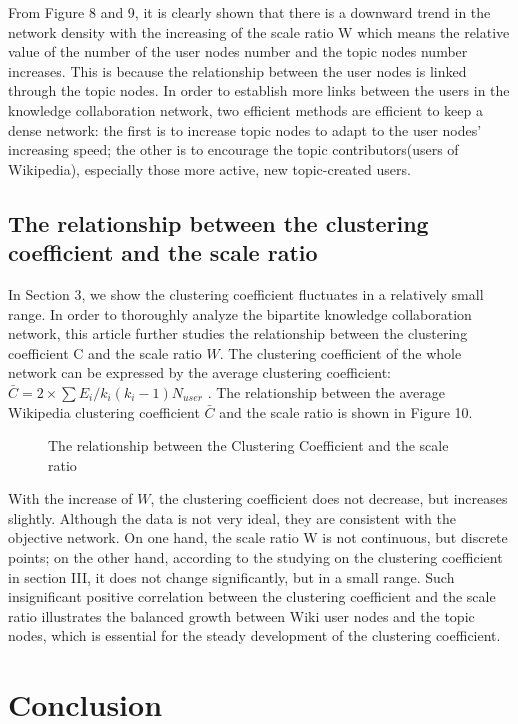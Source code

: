 \documentclass{elsarticle}
\begin{document}
From Figure 8 and 9, it is clearly shown that there is a downward
trend in the network density with the increasing of the scale ratio W
which means the relative value of the number of the user nodes number
and the topic nodes number increases. This is because the relationship
between the user nodes is linked through the topic nodes.  In order to
establish more links between the users in the knowledge collaboration
network,  two efficient methods are efficient to keep a dense network:
the first is to increase topic nodes to adapt to the user nodes’
increasing speed; the other is to encourage the topic
contributors(users of Wikipedia), especially those more active, new topic-created users. 

\subsection{ The relationship between the clustering coefficient and the scale ratio}
\label{sec:relat-betw-clust}
 In Section 3, we show the clustering coefficient fluctuates in a
relatively small range.  In order to thoroughly
analyze the bipartite knowledge collaboration network, this article
further studies the relationship between the clustering coefficient C
and the scale ratio $W$. The clustering coefficient of the whole
network can be expressed by the average clustering coefficient:
$\bar{C}=2\times \sum E_i/k_i(k_i-1)N_{user}$ . The
relationship between the average Wikipedia clustering coefficient
$\bar{C}$ and the scale ratio is shown in Figure 10. 
\begin{figure}[htpb]
  \centering
  \scalebox{0.3}{\texttt{[image: 10]}}
  \caption{The relationship between the  Clustering Coefficient  and the scale ratio}
\end{figure}

With the increase of $W$, the clustering coefficient does not decrease, but increases slightly. Although the data is not very ideal, they are consistent with the objective network. On one hand, the scale ratio W is not continuous, but discrete points; on the other hand, according to the studying on the clustering coefficient in section III, it does not change significantly, but in a small range. Such insignificant positive correlation between the clustering coefficient and the scale ratio illustrates the balanced growth between Wiki user nodes and the topic nodes, which is essential for the steady development of the clustering coefficient. 


\section{Conclusion}
\label{sec:5concl-disc-}
\end{document}
